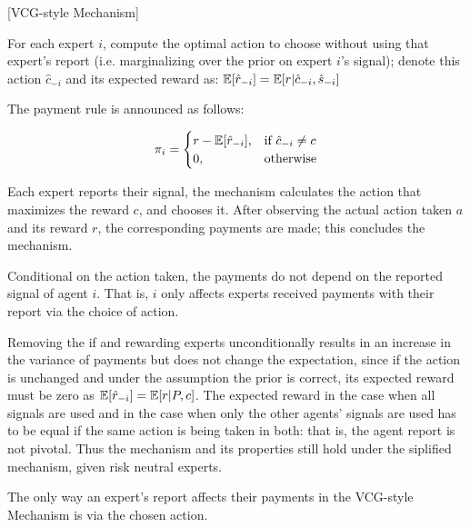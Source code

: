 \begin{mech}\label{mech:vcg-style}[VCG-style Mechanism]



For each expert $i$, compute the optimal action to choose without using that expert's report (i.e. marginalizing over the prior on expert $i$'s signal); denote this action $\hat{c}_{-i}$ and its expected reward as: $\operatorname*{\mathbb E}[\hat{r}_{-i}] = \operatorname*{\mathbb E}[ r| \hat{c}_{-i}, \hat{s}_{-i}] $


The payment rule is announced as follows:

\[
    \pi_i = 
\begin{cases}
    r - \expec[\hat{r}_{-i}] ,& \text{if } \hat{c}_{-i} \neq c\\
    0,              & \text{otherwise}
\end{cases}
\]

%

Each expert reports their signal, the mechanism calculates the action that maximizes the reward $c$, and chooses it. After observing the actual action taken $a$ and its reward $r$, the corresponding payments are made; this concludes the mechanism.

\end{mech}


Conditional on the action taken, the payments do not depend on the reported signal of agent $i$.
That is, $i$ only affects experts received payments with their report via the choice of action. 

Removing the if and rewarding experts unconditionally results in an increase in the variance of payments but does not change the expectation, since if the action is unchanged and under the assumption the prior is correct, its expected reward must be zero as $\operatorname*{\mathbb E}[\hat{r}_{-i}] = \operatorname*{\mathbb E}[r|P,c]$. 
The expected reward in the case when all signals are used and in the case when only the other agents' signals are used has to be equal if the same action is being taken in both: that is, the agent report is not pivotal. 
Thus the mechanism and its properties still hold under the siplified mechanism, given risk neutral experts. 


\begin{lem}\label{lem:affect}
	The only way an expert's report affects their payments in the VCG-style Mechanism is via the chosen action.
\end{lem}

